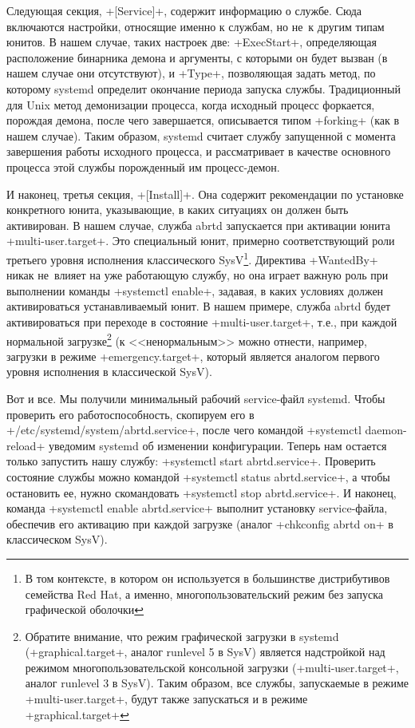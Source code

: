 \documentclass[10pt,oneside,a4paper]{article}
\begin{document}
Следующая секция, +[Service]+, содержит информацию о службе. Сюда включаются
настройки, относящие именно к службам, но не~к другим типам юнитов. В нашем
случае, таких настроек две: +ExecStart+, определяющая расположение бинарника
демона и аргументы, с которыми он будет вызван (в нашем случае они
отсутствуют), и +Type+, позволяющая задать метод, по которому systemd определит
окончание периода запуска службы. Традиционный для Unix метод демонизации
процесса, когда исходный процесс форкается, порождая демона, после чего
завершается, описывается типом +forking+ (как в нашем случае). Таким образом,
systemd считает службу запущенной с момента завершения работы исходного
процесса, и рассматривает в качестве основного процесса этой службы
порожденный им процесс-демон.

И наконец, третья секция, +[Install]+. Она содержит рекомендации по
установке конкретного юнита, указывающие, в каких ситуациях он должен быть
активирован.  В нашем случае, служба abrtd запускается при активации юнита
+multi-user.target+. Это специальный юнит, примерно соответствующий роли
третьего уровня исполнения классического SysV\footnote{В том контексте, в
котором он используется в большинстве дистрибутивов семейства Red Hat, а
именно, многопользовательский режим без запуска графической оболочки}.
Директива +WantedBy+ никак не~влияет на уже работающую службу, но она
играет важную роль при выполнении команды +systemctl enable+, задавая, в каких
условиях должен активироваться устанавливаемый юнит. В нашем примере, служба
abrtd будет активироваться при переходе в состояние +multi-user.target+,
т.е., при каждой нормальной загрузке\footnote{Обратите внимание, что режим
графической загрузки в systemd (+graphical.target+, аналог runlevel 5
в SysV) является надстройкой над режимом многопользовательской консольной
загрузки (+multi-user.target+, аналог runlevel 3 в SysV). Таким
образом, все службы, запускаемые в режиме +multi-user.target+, будут
также запускаться и в режиме +graphical.target+} (к <<ненормальным>>
можно отнести, например, загрузки в режиме +emergency.target+, который
является аналогом первого уровня исполнения в классической SysV).

Вот и все. Мы получили минимальный рабочий service-файл systemd. Чтобы
проверить его работоспособность, скопируем его в
+/etc/systemd/system/abrtd.service+, после чего командой
+systemctl daemon-reload+ уведомим systemd об изменении конфигурации.
Теперь нам остается только запустить нашу службу:
+systemctl start abrtd.service+.  Проверить состояние службы можно
командой +systemctl status abrtd.service+, а чтобы остановить ее, нужно
скомандовать +systemctl stop abrtd.service+. И наконец, команда
+systemctl enable abrtd.service+ выполнит установку service-файла,
обеспечив его активацию при каждой загрузке (аналог +chkconfig abrtd on+
в классическом SysV).
\end{document}
